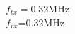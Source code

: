 \documentclass[preview]{standalone}
\begin{document}
\begin{center}
$f_{tx}=$0.32MHz\\$f_{rx}$=0.32MHz
\end{center}
\end{document}
